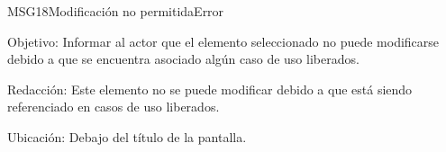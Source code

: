\begin{mensaje}{MSG18}{Modificación no permitida}{Error}
	\item [Objetivo:] Informar al actor que el elemento seleccionado no puede modificarse debido a que se encuentra asociado algún caso de uso liberados.
	\item[Redacción:] Este elemento no se puede modificar debido a que está siendo referenciado en casos de uso liberados.
	\item [Ubicación:] Debajo del título de la pantalla.
\end{mensaje}